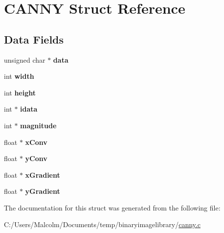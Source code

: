 \hypertarget{struct_c_a_n_n_y}{}\section{C\+A\+N\+NY Struct Reference}
\label{struct_c_a_n_n_y}
\subsection*{Data Fields}
\begin{DoxyCompactItemize}
\item 
unsigned char $\ast$ {\bfseries data}\hypertarget{struct_c_a_n_n_y_a3cd792d6cc1b8f2af9a5a536bb922b17}{}\label{struct_c_a_n_n_y_a3cd792d6cc1b8f2af9a5a536bb922b17}

\item 
int {\bfseries width}\hypertarget{struct_c_a_n_n_y_abf7b9fa930751c2a0c08ad9d4f36447a}{}\label{struct_c_a_n_n_y_abf7b9fa930751c2a0c08ad9d4f36447a}

\item 
int {\bfseries height}\hypertarget{struct_c_a_n_n_y_ae5268e21dce76ee830b2c37538c3f4e5}{}\label{struct_c_a_n_n_y_ae5268e21dce76ee830b2c37538c3f4e5}

\item 
int $\ast$ {\bfseries idata}\hypertarget{struct_c_a_n_n_y_a715b48c6b428457c04c7dfd008cf145e}{}\label{struct_c_a_n_n_y_a715b48c6b428457c04c7dfd008cf145e}

\item 
int $\ast$ {\bfseries magnitude}\hypertarget{struct_c_a_n_n_y_a4142553c68cae4969658c38710b735ed}{}\label{struct_c_a_n_n_y_a4142553c68cae4969658c38710b735ed}

\item 
float $\ast$ {\bfseries x\+Conv}\hypertarget{struct_c_a_n_n_y_a43cadae92c47238ed450e49346531c2d}{}\label{struct_c_a_n_n_y_a43cadae92c47238ed450e49346531c2d}

\item 
float $\ast$ {\bfseries y\+Conv}\hypertarget{struct_c_a_n_n_y_af0b4307fa9ac5d44278e60c68ac21a73}{}\label{struct_c_a_n_n_y_af0b4307fa9ac5d44278e60c68ac21a73}

\item 
float $\ast$ {\bfseries x\+Gradient}\hypertarget{struct_c_a_n_n_y_acee34f5b2a2efb10a047710f07532514}{}\label{struct_c_a_n_n_y_acee34f5b2a2efb10a047710f07532514}

\item 
float $\ast$ {\bfseries y\+Gradient}\hypertarget{struct_c_a_n_n_y_a26bbd60c2cdefea2ddead831d6041190}{}\label{struct_c_a_n_n_y_a26bbd60c2cdefea2ddead831d6041190}

\end{DoxyCompactItemize}


The documentation for this struct was generated from the following file\+:\begin{DoxyCompactItemize}
\item 
C\+:/\+Users/\+Malcolm/\+Documents/temp/binaryimagelibrary/\hyperlink{canny_8c}{canny.\+c}\end{DoxyCompactItemize}
